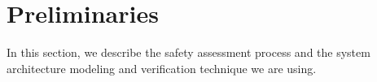 \section{Preliminaries}
\label{sec:prelims}
In this section, we describe the safety assessment process and the system architecture modeling and verification technique we are using.






